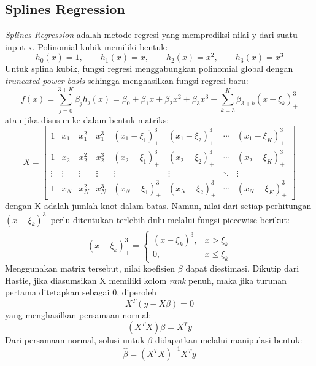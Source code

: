 \documentclass{article}
\begin{document}
\subsection{Splines Regression}
\textit{Splines Regression} adalah metode regresi yang memprediksi nilai y dari suatu input x. Polinomial kubik memiliki bentuk: 
\[
h_0(x) = 1, \qquad 
h_1(x) = x, \qquad
h_2(x) = x^2, \qquad
h_3(x) = x^3
\]
Untuk splina kubik, fungsi regresi menggabungkan polinomial global dengan \textit{truncated power basis} sehingga menghasilkan fungsi regresi baru:
\[
f(x) = \sum_{j = 0}^{3+K} \beta_jh_j(x) = \beta_0 + \beta_1x + \beta_2x^2 + \beta_3x^3 + \sum_{k = 3}^{K} \beta_{3+k}(x-\xi_k)^3_+
\]
atau jika disusun ke dalam bentuk matriks:
\[
X=
\begin{bmatrix}
1 & x_1 & x_1^2 & x_1^3 &
(x_1-\xi_1)_+^3 &
(x_1-\xi_2)_+^3 &
\cdots &
(x_1-\xi_K)_+^3
\\
1 & x_2 & x_2^2 & x_2^3 &
(x_2-\xi_1)_+^3 &
(x_2-\xi_2)_+^3 &
\cdots &
(x_2-\xi_K)_+^3
\\
\vdots & \vdots & \vdots & \vdots &
\vdots & \vdots & \ddots & \vdots
\\
1 & x_N & x_N^2 & x_N^3 &
(x_N-\xi_1)_+^3 &
(x_N-\xi_2)_+^3 &
\cdots &
(x_N-\xi_K)_+^3
\end{bmatrix}
\]
dengan K adalah jumlah knot dalam batas. Namun, nilai dari setiap perhitungan $(x-\xi_k)_+^3$ perlu ditentukan terlebih dulu melalui fungsi piecewise berikut:
\[
(x-\xi_k)_+^3 = 
\begin{cases}
    (x-\xi_k)^3, & x > \xi_k \\
    0, &x \leq \xi_k 
\end{cases}
\]
Menggunakan matrix tersebut, nilai koefisien $\beta$ dapat diestimasi. Dikutip dari Hastie, jika diasumsikan X memiliki kolom \textit{rank} penuh, maka jika turunan pertama ditetapkan sebagai 0, diperoleh \cite{hastie}
\[
X^T(y-X\beta) = 0
\]
yang menghasilkan persamaan normal:
\[
(X^TX)\beta = X^Ty
\]
Dari persamaan normal, solusi untuk $\beta$ didapatkan melalui manipulasi bentuk:
\[
\hat{\beta} = (X^TX)^{-1}X^Ty
\]
\end{document}
